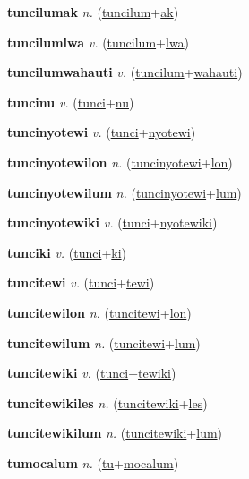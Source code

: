 \textbf{\hypertarget{tuncilumak}{tuncilumak}} \textit{n.} (\hyperlink{tuncilum}{tuncilum}+\allowbreak \hyperlink{ak}{ak})


\textbf{\hypertarget{tuncilumlwa}{tuncilumlwa}} \textit{v.} (\hyperlink{tuncilum}{tuncilum}+\allowbreak \hyperlink{lwa}{lwa})


\textbf{\hypertarget{tuncilumwahauti}{tuncilumwahauti}} \textit{v.} (\hyperlink{tuncilum}{tuncilum}+\allowbreak \hyperlink{wahauti}{wahauti})


\textbf{\hypertarget{tuncinu}{tuncinu}} \textit{v.} (\hyperlink{tunci}{tunci}+\allowbreak \hyperlink{nu}{nu})


\textbf{\hypertarget{tuncinyotewi}{tuncinyotewi}} \textit{v.} (\hyperlink{tunci}{tunci}+\allowbreak \hyperlink{nyotewi}{nyotewi})


\textbf{\hypertarget{tuncinyotewilon}{tuncinyotewilon}} \textit{n.} (\hyperlink{tuncinyotewi}{tuncinyotewi}+\allowbreak \hyperlink{lon}{lon})


\textbf{\hypertarget{tuncinyotewilum}{tuncinyotewilum}} \textit{n.} (\hyperlink{tuncinyotewi}{tuncinyotewi}+\allowbreak \hyperlink{lum}{lum})


\textbf{\hypertarget{tuncinyotewiki}{tuncinyotewiki}} \textit{v.} (\hyperlink{tunci}{tunci}+\allowbreak \hyperlink{nyotewiki}{nyotewiki})


\textbf{\hypertarget{tunciki}{tunciki}} \textit{v.} (\hyperlink{tunci}{tunci}+\allowbreak \hyperlink{ki}{ki})


\textbf{\hypertarget{tuncitewi}{tuncitewi}} \textit{v.} (\hyperlink{tunci}{tunci}+\allowbreak \hyperlink{tewi}{tewi})


\textbf{\hypertarget{tuncitewilon}{tuncitewilon}} \textit{n.} (\hyperlink{tuncitewi}{tuncitewi}+\allowbreak \hyperlink{lon}{lon})


\textbf{\hypertarget{tuncitewilum}{tuncitewilum}} \textit{n.} (\hyperlink{tuncitewi}{tuncitewi}+\allowbreak \hyperlink{lum}{lum})


\textbf{\hypertarget{tuncitewiki}{tuncitewiki}} \textit{v.} (\hyperlink{tunci}{tunci}+\allowbreak \hyperlink{tewiki}{tewiki})


\textbf{\hypertarget{tuncitewikiles}{tuncitewikiles}} \textit{n.} (\hyperlink{tuncitewiki}{tuncitewiki}+\allowbreak \hyperlink{les}{les})


\textbf{\hypertarget{tuncitewikilum}{tuncitewikilum}} \textit{n.} (\hyperlink{tuncitewiki}{tuncitewiki}+\allowbreak \hyperlink{lum}{lum})


\textbf{\hypertarget{tumocalum}{tumocalum}} \textit{n.} (\hyperlink{tu}{tu}+\allowbreak \hyperlink{mocalum}{mocalum})


